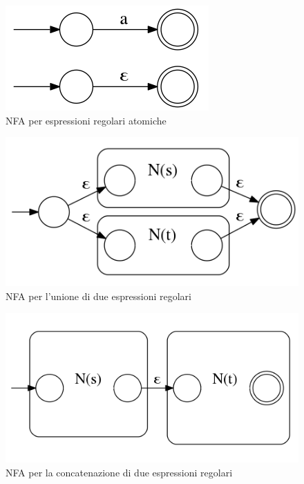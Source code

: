\begin{figure}[htbp]
\centering
\includegraphics[scale=0.4]{./Img/automi/re_atom.png}
\caption{NFA per espressioni regolari atomiche}
\label{fig:re_atom}
\end{figure}


\begin{figure}[htbp]
\centering
\includegraphics[scale=0.4]{./Img/automi/re_union.png}
\caption{NFA per l'unione di due espressioni regolari}
\label{fig:re_union}
\end{figure}

\begin{figure}[htbp]
\centering
\includegraphics[scale=0.4]{./Img/automi/re_concat.png}
\caption{NFA per la concatenazione di due espressioni regolari}
\label{fig:re_concat}
\end{figure}

